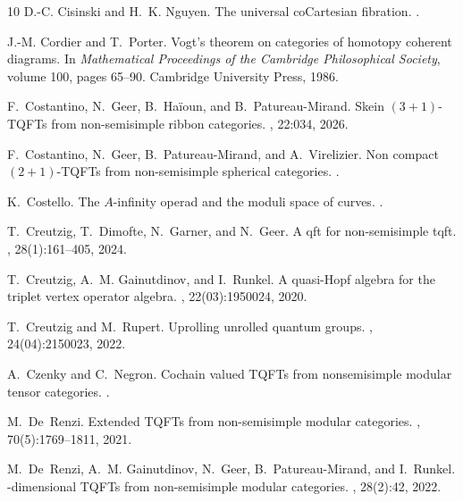 \documentclass[reqno]{amsart}
\theoremstyle{definition}
\renewcommand{\1}{\mathbf{1}}
\begin{document}
\begin{thebibliography}{10}
D.-C. Cisinski and H.~K. Nguyen.
\newblock The universal co{C}artesian fibration.
.

J.-M. Cordier and T.~Porter.
\newblock Vogt's theorem on categories of homotopy coherent diagrams.
\newblock In {\em Mathematical Proceedings of the Cambridge Philosophical
  Society}, volume 100, pages 65--90. Cambridge University Press, 1986.

F.~Costantino, N.~Geer, B.~Ha\"ioun, and B.~Patureau-Mirand.
\newblock Skein $(3+1)$-{TQFT}s from non-semisimple ribbon categories.
, 22:034, 2026.

F.~Costantino, N.~Geer, B.~Patureau-Mirand, and A.~Virelizier.
\newblock Non compact $(2+1)$-{TQFT}s from non-semisimple spherical categories.
.

K.~Costello.
\newblock The ${A}$-infinity operad and the moduli space of curves.
.

T.~Creutzig, T.~Dimofte, N.~Garner, and N.~Geer.
\newblock A qft for non-semisimple tqft.
, 28(1):161--405, 2024.

T.~Creutzig, A.~M. Gainutdinov, and I.~Runkel.
\newblock A quasi-{H}opf algebra for the triplet vertex operator algebra.
, 22(03):1950024, 2020.

T.~Creutzig and M.~Rupert.
\newblock Uprolling unrolled quantum groups.
, 24(04):2150023, 2022.

A.~Czenky and C.~Negron.
\newblock Cochain valued {TQFT}s from nonsemisimple modular tensor categories.
.

M.~De~Renzi.
\newblock Extended {TQFT}s from non-semisimple modular categories.
, 70(5):1769--1811, 2021.

M.~De~Renzi, A.~M. Gainutdinov, N.~Geer, B.~Patureau-Mirand, and I.~Runkel.
-dimensional {TQFT}s from non-semisimple modular categories.
, 28(2):42, 2022.


\end{thebibliography}
\end{document}
